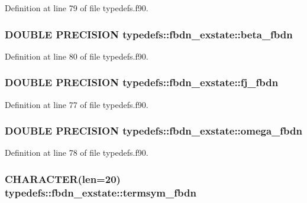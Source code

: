 Definition at line 79 of file typedefs.f90.\hypertarget{typetypedefs_1_1fbdn__exstate_a690aa05deb0d2ffba11f3ae2aaf0e9af}{
\subsubsection[{beta\_\-fbdn}]{\setlength{\rightskip}{0pt plus 5cm}DOUBLE PRECISION {\bf typedefs::fbdn\_\-exstate::beta\_\-fbdn}}}
\label{typetypedefs_1_1fbdn__exstate_a690aa05deb0d2ffba11f3ae2aaf0e9af}


Definition at line 80 of file typedefs.f90.\hypertarget{typetypedefs_1_1fbdn__exstate_a0acc4647581eff1d24ce1d71d3f73f8b}{
\subsubsection[{fj\_\-fbdn}]{\setlength{\rightskip}{0pt plus 5cm}DOUBLE PRECISION {\bf typedefs::fbdn\_\-exstate::fj\_\-fbdn}}}
\label{typetypedefs_1_1fbdn__exstate_a0acc4647581eff1d24ce1d71d3f73f8b}


Definition at line 77 of file typedefs.f90.\hypertarget{typetypedefs_1_1fbdn__exstate_af1c6388e1f1f6455d2ee128b875f7adc}{
\subsubsection[{omega\_\-fbdn}]{\setlength{\rightskip}{0pt plus 5cm}DOUBLE PRECISION {\bf typedefs::fbdn\_\-exstate::omega\_\-fbdn}}}
\label{typetypedefs_1_1fbdn__exstate_af1c6388e1f1f6455d2ee128b875f7adc}


Definition at line 78 of file typedefs.f90.\hypertarget{typetypedefs_1_1fbdn__exstate_a5d5aa9abbdf8366cd5bd2a88cb2d2cd2}{
\subsubsection[{termsym\_\-fbdn}]{\setlength{\rightskip}{0pt plus 5cm}CHARACTER(len=20) {\bf typedefs::fbdn\_\-exstate::termsym\_\-fbdn}}}
\label{typetypedefs_1_1fbdn__exstate_a5d5aa9abbdf8366cd5bd2a88cb2d2cd2}


